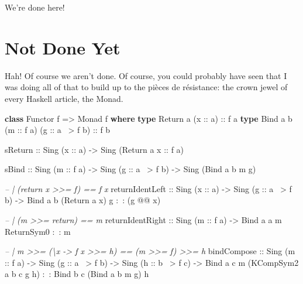 \documentclass[]{article}
\newenvironment{Shaded}{}{}
\newcommand{\KeywordTok}[1]{\textcolor[rgb]{0.00,0.44,0.13}{\textbf{{#1}}}}
\newcommand{\DataTypeTok}[1]{\textcolor[rgb]{0.56,0.13,0.00}{{#1}}}
\newcommand{\CommentTok}[1]{\textcolor[rgb]{0.38,0.63,0.69}{\textit{{#1}}}}
\newcommand{\OtherTok}[1]{\textcolor[rgb]{0.00,0.44,0.13}{{#1}}}
\newcommand{\FunctionTok}[1]{\textcolor[rgb]{0.02,0.16,0.49}{{#1}}}
\newcommand{\NormalTok}[1]{{#1}}
\begin{document}
We're done here!

\section{Not Done Yet}\label{not-done-yet}

Hah! Of course we aren't done. Of course, you could probably have seen that I
was doing all of that to build up to the pièces de résistance: the crown jewel
of every Haskell article, the Monad.

\begin{Shaded}
\begin{Highlighting}[]
\KeywordTok{class} \DataTypeTok{Functor} \NormalTok{f }\OtherTok{=>} \DataTypeTok{Monad} \NormalTok{f }\KeywordTok{where}
    \KeywordTok{type} \DataTypeTok{Return} \NormalTok{a (}\OtherTok{x ::} \NormalTok{a)}\OtherTok{ ::} \NormalTok{f a}
    \KeywordTok{type} \DataTypeTok{Bind}   \NormalTok{a b (}\OtherTok{m ::} \NormalTok{f a) (}\OtherTok{g ::} \NormalTok{a }\FunctionTok{~>} \NormalTok{f b)}\OtherTok{ ::} \NormalTok{f b}

    \NormalTok{sReturn}
\OtherTok{        ::} \DataTypeTok{Sing} \NormalTok{(}\OtherTok{x ::} \NormalTok{a)}
        \OtherTok{->} \DataTypeTok{Sing} \NormalTok{(}\DataTypeTok{Return} \NormalTok{a}\OtherTok{ x ::} \NormalTok{f a)}

    \NormalTok{sBind}
\OtherTok{        ::} \DataTypeTok{Sing} \NormalTok{(}\OtherTok{m ::} \NormalTok{f a)}
        \OtherTok{->} \DataTypeTok{Sing} \NormalTok{(}\OtherTok{g ::} \NormalTok{a }\FunctionTok{~>} \NormalTok{f b)}
        \OtherTok{->} \DataTypeTok{Sing} \NormalTok{(}\DataTypeTok{Bind}   \NormalTok{a b m g)}

    \CommentTok{-- | (return x >>= f) == f x}
    \NormalTok{returnIdentLeft}
\OtherTok{        ::} \DataTypeTok{Sing} \NormalTok{(}\OtherTok{x ::} \NormalTok{a)}
        \OtherTok{->} \DataTypeTok{Sing} \NormalTok{(}\OtherTok{g ::} \NormalTok{a }\FunctionTok{~>} \NormalTok{f b)}
        \OtherTok{->} \DataTypeTok{Bind} \NormalTok{a b (}\DataTypeTok{Return} \NormalTok{a x) g }\FunctionTok{:~:} \NormalTok{(g }\FunctionTok{@@} \NormalTok{x)}

    \CommentTok{-- | (m >>= return) == m}
    \NormalTok{returnIdentRight}
\OtherTok{        ::} \DataTypeTok{Sing} \NormalTok{(}\OtherTok{m ::} \NormalTok{f a)}
        \OtherTok{->} \DataTypeTok{Bind} \NormalTok{a a m }\DataTypeTok{ReturnSym0} \FunctionTok{:~:} \NormalTok{m}

    \CommentTok{-- | m >>= (\textbackslash{}x -> f x >>= h) == (m >>= f) >>= h}
    \NormalTok{bindCompose}
\OtherTok{        ::} \DataTypeTok{Sing} \NormalTok{(}\OtherTok{m ::} \NormalTok{f a)}
        \OtherTok{->} \DataTypeTok{Sing} \NormalTok{(}\OtherTok{g ::} \NormalTok{a }\FunctionTok{~>} \NormalTok{f b)}
        \OtherTok{->} \DataTypeTok{Sing} \NormalTok{(}\OtherTok{h ::} \NormalTok{b }\FunctionTok{~>} \NormalTok{f c)}
        \OtherTok{->} \DataTypeTok{Bind} \NormalTok{a c m (}\DataTypeTok{KCompSym2} \NormalTok{a b c g h) }\FunctionTok{:~:} \DataTypeTok{Bind} \NormalTok{b c (}\DataTypeTok{Bind} \NormalTok{a b m g) h}


\end{Highlighting}
\end{Shaded}
\end{document}

